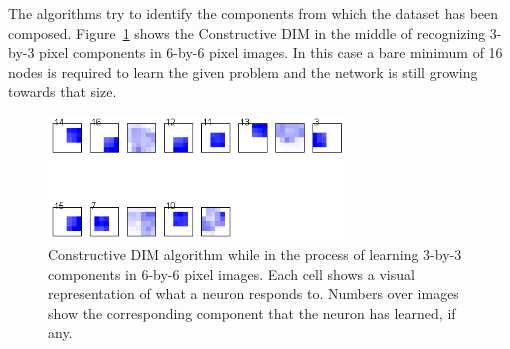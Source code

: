 \documentclass[11pt,a4paper]{report}
\begin{document}
				The algorithms try to identify the components from which the dataset has been composed. Figure~\ref{fig:learning_squares} shows the Constructive DIM in the middle of recognizing 3-by-3 pixel components in 6-by-6 pixel images. In this case a bare minimum of 16 nodes is required to learn the given problem and the network is still growing towards that size.
				
				\begin{figure}[h]
					\centering
					\includegraphics[width=0.7\textwidth]{learning_squares}
					\caption[Constructive DIM algorithm in the process of learning 3-by-3 components in 6-by-6 pixel images]{Constructive DIM algorithm while in the process of learning 3-by-3 components in 6-by-6 pixel images. Each cell shows a visual representation of what a neuron responds to. Numbers over images show the corresponding component that the neuron has learned, if any.}
					\label{fig:learning_squares}
				\end{figure}
				
				\newpage
				
\end{document}

